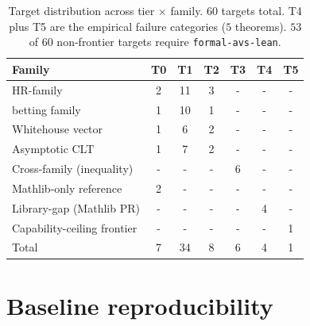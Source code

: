 \begin{table}[!t]
\centering
\small
\caption{Target distribution across tier $\times$ family. $60$
targets total. T4 plus T5 are the empirical failure categories
($5$ theorems). $53$ of $60$ non-frontier targets require
\texttt{formal-avs-lean}.}
\label{tab:tier-dist}
\begin{tabular}{lcccccc}
\toprule
Family & T0 & T1 & T2 & T3 & T4 & T5 \\
\midrule
HR-family                    & 2 & 11 & 3 & - & - & - \\
betting family               & 1 & 10 & 1 & - & - & - \\
Whitehouse vector            & 1 &  6 & 2 & - & - & - \\
Asymptotic CLT               & 1 &  7 & 2 & - & - & - \\
Cross-family (inequality)    & - & - & - & 6 & - & - \\
Mathlib-only reference       & 2 & - & - & - & - & - \\
Library-gap (Mathlib PR)     & - & - & - & - & 4 & - \\
Capability-ceiling frontier  & - & - & - & - & - & 1 \\
\midrule
Total                        & 7 & 34 & 8 & 6 & 4 & 1 \\
\bottomrule
\end{tabular}

\end{table}

\section{Baseline reproducibility}
\label{app:reproducibility}

